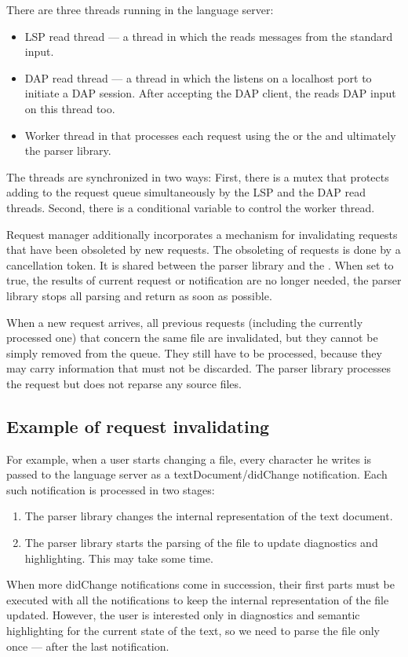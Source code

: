 There are three threads running in the language server:
\begin{itemize}
	\item LSP read thread --- a thread in which the  reads messages from the standard input.
	\item DAP read thread --- a thread in which the  listens on a localhost port to initiate a DAP session. After accepting the DAP client, the  reads DAP input on this thread too.
	\item Worker thread in  that processes each request using the  or the  and ultimately the parser library.
\end{itemize}

The threads are synchronized in two ways: First, there is a mutex that protects adding to the request queue simultaneously by the LSP and the DAP read threads. Second, there is a conditional variable to control the worker thread.

Request manager additionally incorporates a mechanism for invalidating requests that have been obsoleted by new requests. The obsoleting of requests is done by a cancellation token. It is shared between the parser library and the . When set to true, the results of current request or notification are no longer needed, the parser library stops all parsing and return as soon as possible.

When a new request arrives, all previous requests (including the currently processed one) that concern the same file are invalidated, but they cannot be simply removed from the queue. They still have to be processed, because they may carry information that must not be discarded. The parser library processes the request but does not reparse any source files.

\subsection{Example of request invalidating}

For example, when a user starts changing a file, every character he writes is passed to the language server as a textDocument/didChange notification. Each such notification is processed in two stages:
\begin{enumerate}
	\item The parser library changes the internal representation of the text document.
	\item The parser library starts the parsing of the file to update diagnostics and highlighting. This may take some time.
\end{enumerate}
When more didChange notifications come in succession, their first parts must be executed with all the notifications to keep the internal representation of the file updated. However, the user is interested only in diagnostics and semantic highlighting for the current state of the text, so we need to parse the file only once --- after the last notification.





